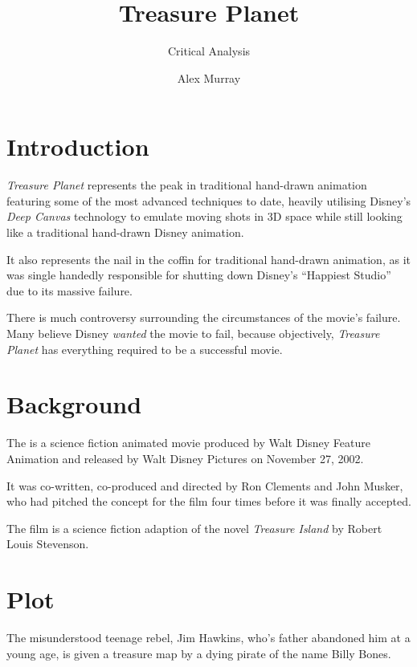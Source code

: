 \documentclass{fhnwreport}
\title{Treasure Planet}
\subtitle{Critical Analysis}
\author{Alex Murray}
\begin{document}
\maketitle
\tableofcontents
\newpage

\begin{multicols}{2}

\section{Introduction}

\textit{Treasure  Planet}   represents  the  peak  in  traditional  hand-drawn
animation featuring some of the most advanced techniques to  date, heavily
utilising  Disney's \textit{Deep Canvas} technology to emulate moving shots  in
3D space while still looking like a traditional hand-drawn Disney animation.

It  also  represents  the  nail  in  the  coffin  for  traditional  hand-drawn
animation, as it was  single  handedly  responsible for shutting down Disney's
``Happiest Studio'' due to its massive failure.

There is  much  controversy  surrounding  the  circumstances  of  the  movie's
failure. Many believe Disney \textit{wanted} the movie to fail, because objectively, \textit{Treasure
Planet} has everything required to be a successful movie. 

\section{Background}

The is a science fiction animated movie produced by Walt Disney Feature Animation and released by Walt Disney Pictures on November 27, 2002.

It was co-written, co-produced and directed by Ron Clements and John Musker, who had pitched the concept for the film four times before it was finally accepted.

The film is a science fiction adaption of the novel \textit{Treasure Island} by Robert Louis Stevenson.

\section{Plot}

The misunderstood teenage rebel, Jim Hawkins, who's father abandoned him at a young age, is given a treasure map by a dying pirate of the name Billy Bones.


\end{multicols}
\end{document}
